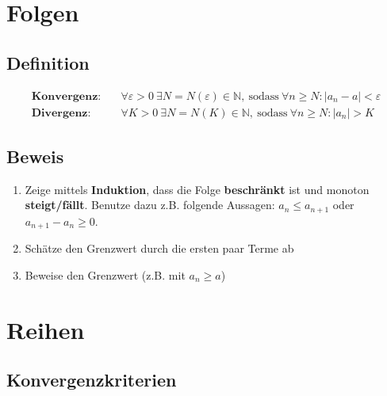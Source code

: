 \documentclass[11pt]{article}
\begin{document}
\section{Folgen}

\subsection{Definition}

\begin{equation*}
\begin{split}
	\textbf{Konvergenz:} \quad & \forall \varepsilon > 0\ \exists N = N(\varepsilon) \in \mathbb{N},\ \text{sodass}\ \forall n \geq N: |a_n - a| < \varepsilon \\
	\textbf{Divergenz:} \quad & \forall K > 0\ \exists N = N(K) \in \mathbb{N},\ \text{sodass}\ \forall n \geq N: |a_n| > K
\end{split}
\end{equation*}

\subsection{Beweis}

\begin{enumerate}
	\item Zeige mittels \textbf{Induktion}, dass die Folge \textbf{beschränkt} ist und monoton \textbf{steigt/fällt}. Benutze dazu z.B. folgende Aussagen: $a_n \leq a_{n+1}$ oder $a_{n+1}-a_n \geq 0$.
	\item Schätze den Grenzwert durch die ersten paar Terme ab
	\item Beweise den Grenzwert (z.B. mit $a_n \geq a$)
\end{enumerate}

\section{Reihen}

\subsection{Konvergenzkriterien}
\end{document}
